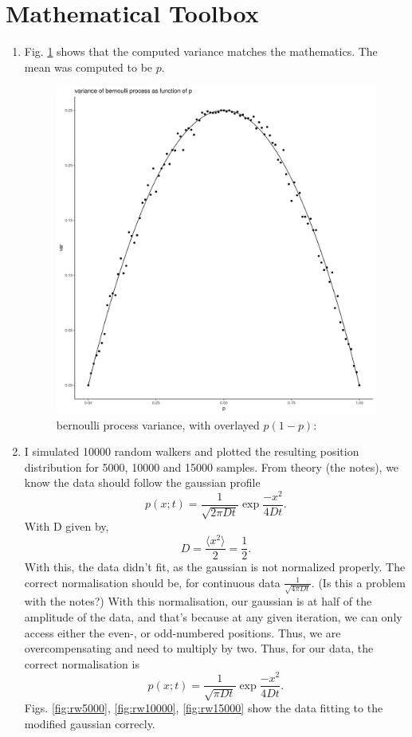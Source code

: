 \documentclass[a4paper]{article}
\begin{document}
\pagebreak

\section{Mathematical Toolbox}

\begin{enumerate}[label={(2. \alph*)}]
    \item
        Fig. \ref{fig:bern} shows that the computed variance matches the mathematics. The mean was computed to be $p$. 
        \begin{figure}
            \includegraphics[width=\linewidth]{./bernoulli_var.png}
            \caption{bernoulli process variance, with overlayed $p(1-p)$:}
            \label{fig:bern}
        \end{figure}
    \item
        I simulated 10000 random walkers and plotted the resulting position distribution for 5000, 10000 and 15000 samples. From theory (the notes), we know the data should follow the gaussian profile \[
        p(x;t) = \frac{1}{\sqrt{2 \pi D t}} \exp{\frac{-x^2}{4 D t}} 
        .\] With D given by,
        \[
            D = \frac{\langle x^2 \rangle}{2} = \frac{1}{2}
        .\] With this, the data didn't fit, as the gaussian is not normalized properly. The correct normalisation should be, for continuous data $\frac{1}{\sqrt{4\pi D t}}$. (Is this a problem with the notes?) With this normalisation, our gaussian is at half of the amplitude of the data, and that's because at any given iteration, we can only access either the even-, or odd-numbered positions. Thus, we are overcompensating and need to multiply by two. Thus, for our data, the correct normalisation is 
        \[
            p(x;t) = \frac{1}{\sqrt{\pi D t}} \exp{\frac{-x^2}{4 D t}} 
        .\]   
        Figs. \ref{fig:rw5000}, \ref{fig:rw10000}, \ref{fig:rw15000} show the data fitting to the modified gaussian correcly. 


\end{enumerate}
\end{document}
